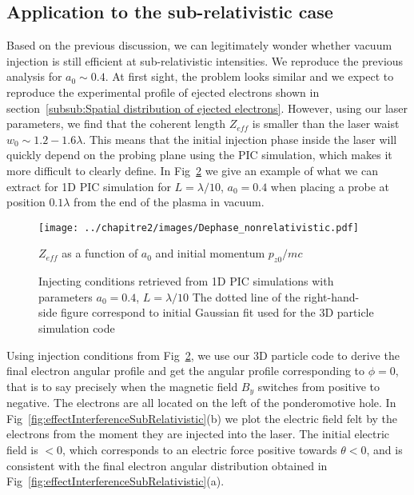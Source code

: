 \subsection{Application to the sub-relativistic case}

Based on the previous discussion, we can legitimately wonder whether vacuum injection is still efficient at sub-relativistic intensities.
We reproduce the previous analysis for $a_0 \sim 0.4$. At first sight, the problem looks similar and we expect to reproduce the experimental profile of ejected electrons shown in section~\ref{subsub:Spatial distribution of ejected electrons}. However, using our laser parameters, we find that the coherent length $Z_{eff}$ is smaller than the laser waist $w_0\sim 1.2-1.6 \lambda$. This means that the initial injection phase inside the laser will quickly depend on the probing plane using the PIC simulation, which makes it more difficult to clearly define. In Fig~\ref{fig:ConditionsInitiales-CWE} we give an example of what we can extract for 1D PIC simulation for $L = \lambda/10$, $a_0 = 0.4$ when placing a probe at position $0.1\lambda$ from the end of the plasma in vacuum. 

\begin{figure}[H]
\begin{center}
\texttt{[image: ../chapitre2/images/Dephase\_nonrelativistic.pdf]}
\end{center}
\caption{\label{fig:Dephase_nonrelativistic} $Z_{eff}$ as a function of $a_0$ and initial momentum $p_{z0}/mc$}
\end{figure}


\begin{figure}[H]
\begin{center}
\end{center}
\caption{\label{fig:ConditionsInitiales-CWE}Injecting conditions retrieved from 1D PIC simulations with parameters $a_0 = 0.4$, $L = \lambda/10$ The dotted line of the right-hand-side figure correspond to initial Gaussian fit used for the 3D particle simulation code}
\end{figure}


Using injection conditions from Fig~\ref{fig:ConditionsInitiales-CWE}, we use our 3D particle code to derive the final electron angular profile and get the angular profile corresponding to $\phi = 0$, that is to say precisely when the magnetic field $B_y$ switches from positive to negative. The electrons are all located on the left of the ponderomotive hole. In Fig~\ref{fig:effectInterferenceSubRelativistic}(b) we plot the electric field felt by the electrons from the moment they are injected into the laser. The initial electric field is $<0$, which corresponds to an electric force positive towards $\theta <0$, and is consistent with the final electron angular distribution obtained in Fig~\ref{fig:effectInterferenceSubRelativistic}(a).


